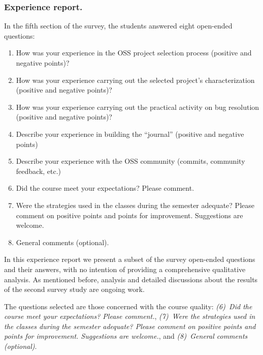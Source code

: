 \documentclass[sigconf]{acmart}
\begin{document}




\subsubsection{Experience report.}

In the fifth section of the survey, the students answered eight open-ended questions: 
\begin{enumerate}
\item How was your experience in the OSS project selection process (positive and negative points)?
\item How was your experience carrying out the selected project's characterization (positive and negative points)?
\item How was your experience carrying out the practical activity on bug resolution (positive and negative points)?
\item Describe your experience in building the ``journal'' (positive and negative points) 
\item Describe your experience with the OSS community (commits, community feedback, etc.)
\item Did the course meet your expectations? Please comment.
\item Were the strategies used in the classes during the semester adequate? Please comment on positive points and points for improvement. Suggestions are welcome.
\item General comments (optional).
\end{enumerate}

In this experience report we present a subset of the survey open-ended questions and their answers, with no intention of providing a comprehensive qualitative analysis. As mentioned before, analysis and detailed discussions about the results of the second survey study are ongoing work.

The questions selected are those concerned with the course quality:
\textit{(6)~Did the course meet your expectations? Please comment.}, 
\textit{(7)~Were the strategies used in the classes during the semester adequate? Please comment on positive points and points for improvement. Suggestions are welcome.}, and
\textit{(8)~General comments (optional)}.
\end{document}
